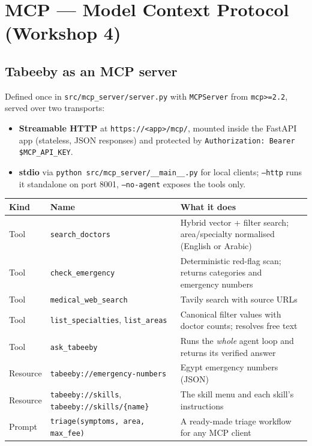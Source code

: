 \documentclass[11pt,a4paper]{article}
\newcommand{\code}[1]{\texttt{#1}}
\begin{document}
\section{MCP --- Model Context Protocol (Workshop 4)}

\subsection{Tabeeby as an MCP server}
Defined once in \code{src/mcp\_server/server.py} with \code{MCPServer} from \code{mcp>=2.2}, served over two transports:

\begin{itemize}
  \item \textbf{Streamable HTTP} at \code{https://<app>/mcp/}, mounted inside the FastAPI app (stateless, JSON responses) and protected by \code{Authorization: Bearer \$MCP\_API\_KEY}.
  \item \textbf{stdio} via \code{python src/mcp\_server/\_\_main\_\_.py} for local clients; \code{--http} runs it standalone on port 8001, \code{--no-agent} exposes the tools only.
\end{itemize}

\begin{center}\small
\begin{tabularx}{\linewidth}{@{}llY@{}}
\toprule
\textbf{Kind} & \textbf{Name} & \textbf{What it does} \\
\midrule
Tool & \code{search\_doctors} & Hybrid vector + filter search; area/specialty normalised (English or Arabic) \\
Tool & \code{check\_emergency} & Deterministic red-flag scan; returns categories and emergency numbers \\
Tool & \code{medical\_web\_search} & Tavily search with source URLs \\
Tool & \code{list\_specialties}, \code{list\_areas} & Canonical filter values with doctor counts; resolves free text \\
Tool & \code{ask\_tabeeby} & Runs the \emph{whole} agent loop and returns its verified answer \\
Resource & \code{tabeeby://emergency-numbers} & Egypt emergency numbers (JSON) \\
Resource & \code{tabeeby://skills}, \code{tabeeby://skills/\{name\}} & The skill menu and each skill's instructions \\
Prompt & \code{triage(symptoms, area, max\_fee)} & A ready-made triage workflow for any MCP client \\
\bottomrule
\end{tabularx}
\end{center}
\end{document}
